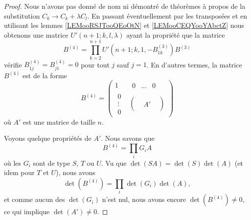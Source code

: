 \begin{proof}
    Nous n'avons pas donné de nom ni démontré de théorèmes à propos de la substitution \( C_k\to C_k+\lambda C_l\). En passant éventuellement par les transposées et en utilisant les lemmes \ref{LEMooRSJTooQEoOtN} et \ref{LEMooCEQYooYAbctZ} nous obtenons une matrice \( U'(n+1;k,l,\lambda)\) ayant la propriété que la matrice
    \begin{equation}
        B^{(4)}=\prod_{k=2}^{n+1}U'(n+1;k,1,-B^{(3)}_{1k})B^{(3)}
    \end{equation}
    vérifie \( B^{(4)}_{1j}=B^{(4)}_{j1}=0\) pour tout \( j\) sauf \( j=1\). En d'autres termes, la matrice \( B^{(4)}\) est de la forme
    \begin{equation}
        B^{(4)}=\begin{pmatrix}
            1    &   \begin{matrix} 
                0    &   \ldots    &   0    
            \end{matrix}\\ 
            \begin{matrix}
                0    \\ 
                \vdots    \\ 
                0    
            \end{matrix}&   \begin{pmatrix}
                    &       &       \\
                    &   A'    &       \\
                    &       &   
            \end{pmatrix}
        \end{pmatrix}
    \end{equation}
    où \( A'\) est une matrice de taille \( n\).
    
    Voyons quelque propriétés de \( A'\). Nous savons que
    \begin{equation}
        B^{(4)}=\prod_i G_iA
    \end{equation}
    où les \( G_i\) sont de type \( S\), \( T\) ou \( U\). Vu que \( \det(SA)=\det(S)\det(A)\) (et idem pour \( T\) et \( U\)), nous avons
    \begin{equation}
        \det(B^{(4)})=\prod_i\det(G_i)\det(A),
    \end{equation}
    et comme aucun des \( \det(G_i)\) n'est nul, nous avons encore \( \det(B^{(4)})\neq 0\), ce qui implique \( \det(A')\neq 0\).


\end{proof}
